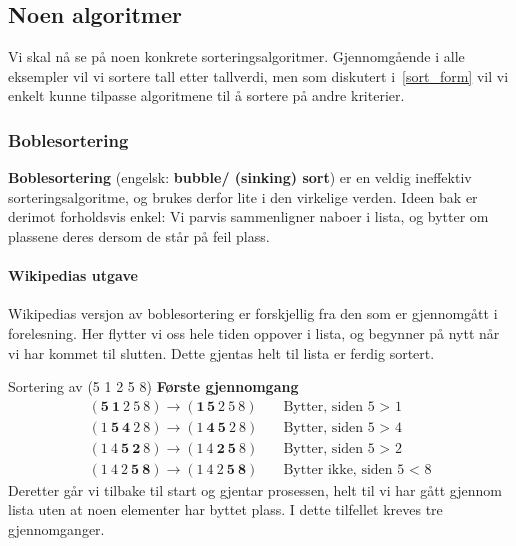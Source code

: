 \subsection{Noen algoritmer}
Vi skal nå se på noen konkrete sorteringsalgoritmer. Gjennomgående i alle
eksempler vil vi sortere tall etter tallverdi, men som diskutert i~\ref{sort_form} vil vi enkelt kunne tilpasse algoritmene til å sortere på andre kriterier. 


\subsubsection{Boblesortering}
\label{bubblesort}
\textbf{Boblesortering} (engelsk: \textbf{bubble/ (sinking) sort})  er en veldig ineffektiv sorteringsalgoritme, og brukes derfor lite i den virkelige verden. 
Ideen bak er derimot forholdsvis enkel:
Vi parvis sammenligner naboer i lista, og bytter om plassene deres dersom de står på feil plass.

\paragraph*{Wikipedias utgave}\label{sec:bubble-wiki}
Wikipedias versjon av boblesortering er forskjellig fra den som er gjennomgått i forelesning.
Her flytter vi oss hele tiden oppover i lista, og begynner på nytt når vi har kommet til slutten.
Dette gjentas helt til lista er ferdig sortert.

\begin{eks} Sortering av (5 1 2 5 8) \newline
  \textbf{Første gjennomgang}
  \begin{align*}
    (\mathbf{5}~ \mathbf{1}~ 2~ 5~ 8) \rightarrow (\mathbf{1}\, \mathbf{5} ~ 2 ~ 5 ~ 8) &\quad \text{Bytter, siden 5 > 1} \\
    (1~ \mathbf{5}~ \mathbf{4}~ 2~ 8) \rightarrow (1 ~ \mathbf{4} ~ \mathbf{5} ~ 2 ~ 8) &\quad \text{Bytter, siden 5 > 4} \\
    (1~ 4~ \mathbf{5}~ \mathbf{2}~ 8) \rightarrow (1~ 4~ \mathbf{2}~ \mathbf{5}~ 8)     &\quad \text{Bytter, siden 5 > 2} \\
    (1~ 4~ 2~ \mathbf{5}~ \mathbf{8}) \rightarrow (1~ 4~ 2~ \mathbf{5}~ \mathbf{8})     &\quad \text{Bytter ikke, siden 5 < 8}
  \end{align*}
  Deretter går vi tilbake til start og gjentar prosessen, helt til vi har gått gjennom lista uten at noen elementer har byttet plass.
  I dette tilfellet kreves tre gjennomganger.
\end{eks}

